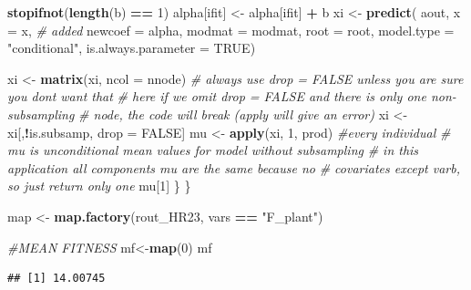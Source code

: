\documentclass[
]{article}
\newenvironment{Shaded}{\begin{snugshade}}{\end{snugshade}}
\newcommand{\AttributeTok}[1]{\textcolor[rgb]{0.13,0.29,0.53}{#1}}
\newcommand{\CommentTok}[1]{\textcolor[rgb]{0.56,0.35,0.01}{\textit{#1}}}
\newcommand{\ConstantTok}[1]{\textcolor[rgb]{0.56,0.35,0.01}{#1}}
\newcommand{\DecValTok}[1]{\textcolor[rgb]{0.00,0.00,0.81}{#1}}
\newcommand{\FunctionTok}[1]{\textcolor[rgb]{0.13,0.29,0.53}{\textbf{#1}}}
\newcommand{\NormalTok}[1]{#1}
\newcommand{\OtherTok}[1]{\textcolor[rgb]{0.56,0.35,0.01}{#1}}
\newcommand{\SpecialCharTok}[1]{\textcolor[rgb]{0.81,0.36,0.00}{\textbf{#1}}}
\newcommand{\StringTok}[1]{\textcolor[rgb]{0.31,0.60,0.02}{#1}}
\begin{document}
\begin{Shaded}
\begin{Highlighting}[]
    \FunctionTok{stopifnot}\NormalTok{(}\FunctionTok{length}\NormalTok{(b) }\SpecialCharTok{==} \DecValTok{1}\NormalTok{)}
\NormalTok{    alpha[ifit] }\OtherTok{\textless{}{-}}\NormalTok{ alpha[ifit] }\SpecialCharTok{+}\NormalTok{ b}
\NormalTok{    xi }\OtherTok{\textless{}{-}} \FunctionTok{predict}\NormalTok{(}
\NormalTok{      aout,}
      \AttributeTok{x =}\NormalTok{ x, }\CommentTok{\# added}
      \AttributeTok{newcoef =}\NormalTok{ alpha,}
      \AttributeTok{modmat =}\NormalTok{ modmat,}
      \AttributeTok{root =}\NormalTok{ root,}
      \AttributeTok{model.type =} \StringTok{"conditional"}\NormalTok{,}
      \AttributeTok{is.always.parameter =} \ConstantTok{TRUE}\NormalTok{)}
  
\NormalTok{    xi }\OtherTok{\textless{}{-}} \FunctionTok{matrix}\NormalTok{(xi, }\AttributeTok{ncol =}\NormalTok{ nnode)}
    \CommentTok{\# always use drop = FALSE unless you are sure you don\textquotesingle{}t want that}
    \CommentTok{\# here if we omit drop = FALSE and there is only one non{-}subsampling}
    \CommentTok{\# node, the code will break (apply will give an error)}
\NormalTok{    xi }\OtherTok{\textless{}{-}}\NormalTok{ xi[,}\SpecialCharTok{!}\NormalTok{is.subsamp, drop }\OtherTok{=} \ConstantTok{FALSE}\NormalTok{]}
\NormalTok{    mu }\OtherTok{\textless{}{-}} \FunctionTok{apply}\NormalTok{(xi, }\DecValTok{1}\NormalTok{, prod) }\CommentTok{\#every individual}
    \CommentTok{\# mu is unconditional mean values for model without subsampling}
    \CommentTok{\# in this application all components mu are the same because no}
    \CommentTok{\# covariates except varb, so just return only one}
\NormalTok{    mu[}\DecValTok{1}\NormalTok{] }
\NormalTok{  \}}
\NormalTok{\}}

\NormalTok{map }\OtherTok{\textless{}{-}} \FunctionTok{map.factory}\NormalTok{(rout\_HR23, vars }\SpecialCharTok{==} \StringTok{"F\_plant"}\NormalTok{)}

\CommentTok{\#MEAN FITNESS}
\NormalTok{mf}\OtherTok{\textless{}{-}}\FunctionTok{map}\NormalTok{(}\DecValTok{0}\NormalTok{)}
\NormalTok{mf}
\end{Highlighting}
\end{Shaded}

\begin{verbatim}
## [1] 14.00745
\end{verbatim}

\begin{Shaded}
\end{Shaded}
\end{document}
